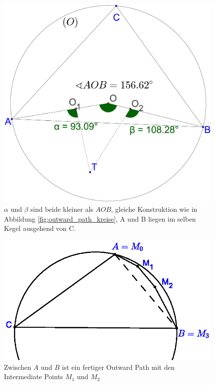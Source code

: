 \documentclass[a4paper,twoside]{IEEEtran}
\begin{document}
\begin{figure}[h!]
\centering
\includegraphics[width=0.8\linewidth]{outward_path_winkel.eps}
\caption{ $\alpha $ und $\beta $ sind beide kleiner als $ AOB $, gleiche Konstruktion wie in Abbildung \ref{fig:outward_path_kreise}, A und B liegen im selben Kegel ausgehend von C.}
\label{fig:outward_path_winkel}
\end{figure}

\begin{figure}[h!]
\centering
\includegraphics[width=1\linewidth]{outward_path_fertig.eps}
\caption{Zwischen $A $ und $B $ ist ein fertiger Outward Path mit den Intermediate Points $M_1 $ und $M_2 $}
\label{fig:outward_path_fertig}
\end{figure}
\end{document}
